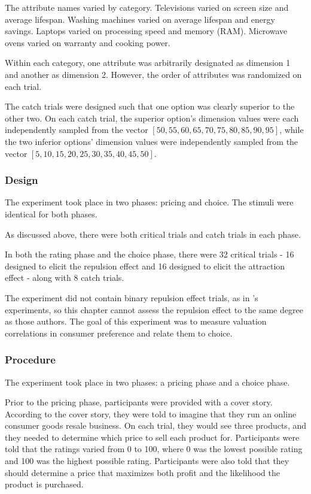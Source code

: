 The attribute names varied by category. Televisions varied on screen size and average lifespan. Washing machines varied on average lifespan and energy savings. Laptops varied on processing speed and memory (RAM). Microwave ovens varied on warranty and cooking power. 

Within each category, one attribute was arbitrarily designated as dimension 1 and another as dimension 2. However, the order of attributes was randomized on each trial.

The catch trials were designed such that one option was clearly superior to the other two. On each catch trial, the superior option's dimension values were each independently sampled from the vector $[50,55,60,65,70,75,80,85,90,95]$, while the two inferior options' dimension values were independently sampled from the vector $[5,10,15,20,25,30,35,40,45,50]$. 

\subsubsection{Design}

The experiment took place in two phases: pricing and choice. The stimuli were identical for both phases.

As discussed above, there were both critical trials and catch trials in each phase. 

In both the rating phase and the choice phase, there were 32 critical trials - 16 designed to elicit the repulsion effect and 16 designed to elicit the attraction effect - along with 8 catch trials.

The experiment did not contain binary repulsion effect trials, as in \textcite{banerjeeFactorsThatPromote2024}'s experiments, so this chapter cannot assess the repulsion effect to the same degree as those authors. The goal of this experiment was to measure valuation correlations in consumer preference and relate them to choice.

\subsubsection{Procedure}

The experiment took place in two phases: a pricing phase and a choice phase.

Prior to the pricing phase, participants were provided with a cover story. According to the cover story, they were told to imagine that they run an online consumer goods resale business. On each trial, they would see three products, and they needed to determine which price to sell each product for. Participants were told that the ratings varied from 0 to 100, where 0 was the lowest possible rating and 100 was the highest possible rating. Participants were also told that they should determine a price that maximizes both profit and the likelihood the product is purchased. 

